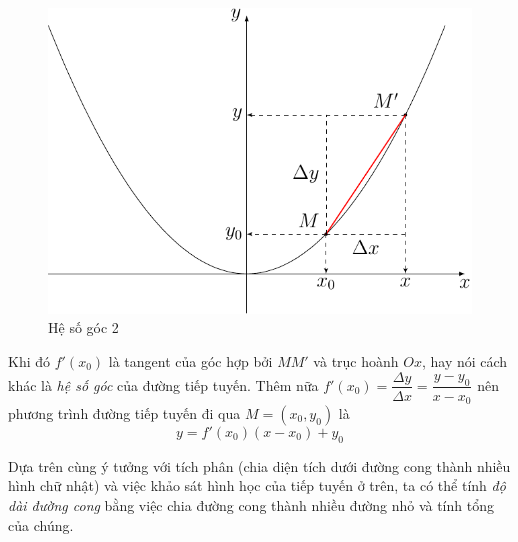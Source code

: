 \begin{figure}[ht]
	\centering
	\includegraphics[page=2,scale=0.75]{analytic_geometry/int2.pdf}
	\caption{Hệ số góc 2}
	\label{int2b}
\end{figure}

Khi đó $f'(x_0)$ là tangent của góc hợp bởi $MM'$ và trục hoành $Ox$, hay nói cách khác là \textit{hệ số góc} của đường tiếp tuyến. Thêm nữa $f'(x_0) = \dfrac{\Delta y}{\Delta x} = \dfrac{y - y_0}{x - x_0}$ nên phương trình đường tiếp tuyến đi qua $M = (x_0, y_0)$ là
\begin{equation}
	y = f'(x_0) (x - x_0) + y_0
\end{equation}

Dựa trên cùng ý tưởng với tích phân (chia diện tích dưới đường cong thành nhiều hình chữ nhật) và việc khảo sát hình học của tiếp tuyến ở trên, ta có thể tính \textit{độ dài đường cong}  bằng việc chia đường cong thành nhiều đường nhỏ và tính tổng của chúng.
